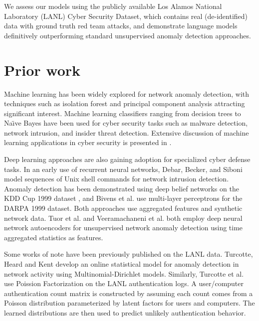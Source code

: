 \documentclass[letterpaper]{article} %
\begin{document}
 We assess our models using the publicly available Los Alamos National Laboratory (LANL) Cyber Security Dataset,
which contains real (de-identified) data with ground truth red team attacks, and demonstrate
 language models definitively outperforming standard unsupervised anomaly detection approaches.

\section{Prior work}

Machine learning has been widely explored for network anomaly detection,
with techniques such as isolation forest \cite{gavai2015supervised,LiuTingZhou08}
and principal component analysis \cite{novakov2013studies,Ringberg2007SensitivityOP} attracting significant interest.
Machine learning classifiers ranging from decision trees to Na\"{\i}ve Bayes have been used for cyber security tasks such as malware detection, network intrusion, and insider threat detection.
Extensive discussion of machine learning applications in cyber security is presented in
\cite{bhattacharyya2013network,buczak2016survey,dua2016data,kumar2010use,zuech2015intrusion,rubin2016anomaly}.

Deep learning approaches are also gaining adoption for specialized cyber defense tasks.
In an early use of recurrent neural networks, Debar, Becker, and Siboni  model sequences of Unix shell commands for network intrusion detection.
Anomaly detection has been demonstrated using deep belief networks on the KDD Cup 1999 dataset \cite{alrawashdeh2016toward},
and Bivens et al.  use multi-layer perceptrons for the DARPA 1999 dataset.
Both approaches use aggregated features and synthetic network data.
 Tuor et al.  and Veeramachaneni et al.  both employ deep neural network autoencoders for unsupervised network anomaly detection using time aggregated statistics as features.

Some works of note have been previously published on the LANL data.
Turcotte, Heard and Kent  develop an online statistical model for anomaly detection in network activity using Multinomial-Dirichlet models.
Similarly, Turcotte et al.  use Poission Factorization \cite{gopalan2013scalable} on the LANL authentication logs.
A user/computer authentication count matrix is constructed by assuming each count comes from a Poisson distribution parameterized by latent factors for users and computers.
The learned distributions are then used to predict unlikely authentication behavior.
\end{document}
